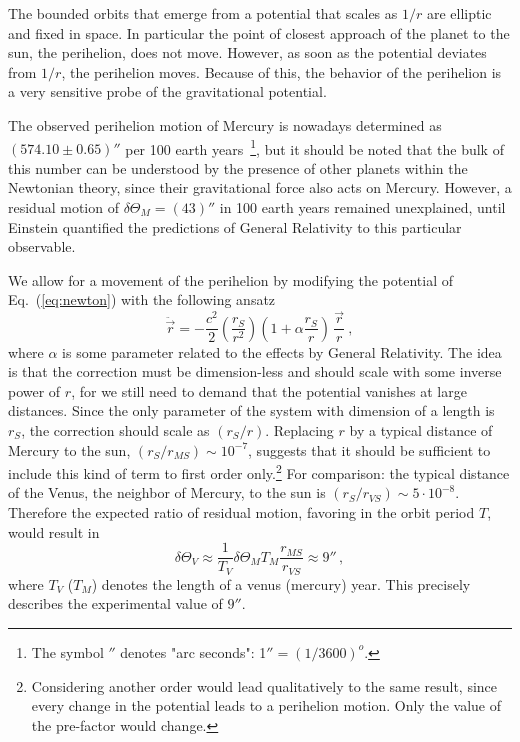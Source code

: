 \documentclass[12pt,ngerman,american]{iopart}
\begin{document}
The bounded orbits that emerge from a potential that scales as $1/r$ are elliptic and fixed in space.
In particular the point of closest approach of the planet to the sun, the perihelion, does not move.
However, as soon as the potential deviates from $1/r$, the perihelion moves.
Because of this, the behavior of the perihelion is a very sensitive probe of the gravitational potential. 

The observed perihelion motion of Mercury is nowadays determined as $(574.10\pm 0.65)''$ per
100 earth years~\footnote{The symbol $''$ denotes "arc seconds": 1$''=(1/3600)^o$. }, but it should be noted that the bulk of this number
can be understood by the presence of other planets within the Newtonian theory, since
their gravitational force also acts on Mercury. However, a
residual motion of $\delta \Theta_M = (43)''$ in 100 earth years remained unexplained, until Einstein quantified the
predictions of General Relativity to this particular observable. 

We allow for a movement of the perihelion by modifying the potential of Eq.~(\ref{eq:newton}) with the following ansatz
\begin{equation}
\ddot{\vec r} = - \frac{c^2}{2}\left(\frac{r_S}{r^2}\right)\left(1+\alpha\frac{r_S}{r}\right) \, \frac{\vec{r}}{r} \ ,
\label{eq:newton_art}
\end{equation}
where $\alpha$ is some parameter related to the effects by General Relativity.
The idea is that the correction must be dimension-less and should scale with some inverse power of $r$, for we still need to demand that the potential vanishes at large distances.
Since the only parameter of the system with dimension of a length is $r_S$, the correction should scale as $(r_S/r)$.
Replacing $r$ by a typical distance of Mercury to the sun, $(r_S/r_{MS})\sim 10^{-7}$, suggests that it should be sufficient to include this kind of term to first order only.\footnote{Considering another order would lead qualitatively to the same result, since every change in the potential leads to a perihelion motion. Only the value of the pre-factor would change.}
For comparison: the typical distance of the Venus, the neighbor of Mercury, to the sun is $(r_S/r_{VS}) \sim 5 \cdot 10^{-8}$.
Therefore the expected ratio of residual motion, favoring in the orbit period $T$, would result in
\begin{equation}
	\delta \Theta_V \approx \frac{1}{T_V} \delta \Theta_M T_M \frac{r_{MS}}{r_{VS}} \approx 9'' \, ,
\end{equation}
where $T_V$ ($T_M$) denotes the length of a venus (mercury) year. This precisely describes the experimental value of $9''$.
\end{document}
